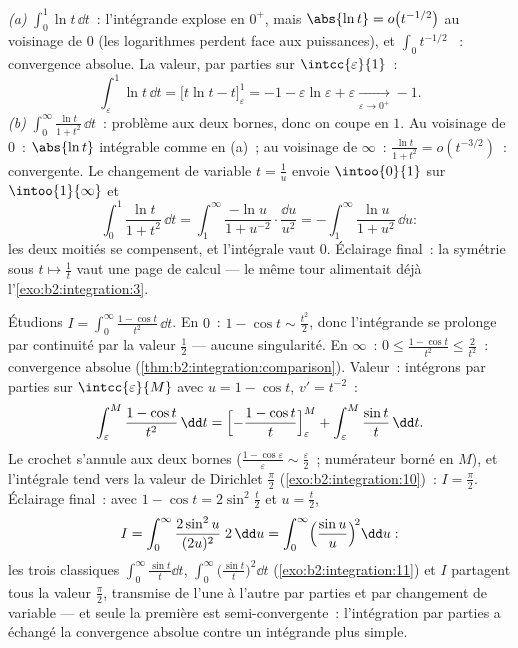 \begin{example}\label{ex:b2:integration:warmups}
\emph{(a)} $\displaystyle\int_0^1 \ln t\,\dd t$~: l'intégrande
explose en $0^+$, mais $\abs{\ln t} = o\bigl(t^{-1/2}\bigr)$
au voisinage de $0$ (les logarithmes perdent face aux puissances), et $\int_0 t^{-1/2}$
~: convergence absolue. La valeur, par parties sur
$\intcc{\varepsilon}{1}$~:
\[
\int_\varepsilon^1 \ln t\,\dd t
= \bigl[t\ln t - t\bigr]_\varepsilon^1
= -1 - \varepsilon\ln\varepsilon + \varepsilon
\xrightarrow[\varepsilon\to0^+]{} -1 .
\]
\emph{(b)} $\displaystyle\int_0^\infty \frac{\ln t}{1 +
t^2}\,\dd t$~: problème aux deux bornes, donc on coupe en $1$. Au voisinage de $0$~:
$\abs{\ln t}$ intégrable comme en (a)~; au voisinage de $\infty$~: $\frac{\ln
t}{1+t^2} = o(t^{-3/2})$~:  convergente. Le
changement de variable $t = \frac1u$ envoie $\intoo{0}{1}$ sur
$\intoo{1}{\infty}$ et
\[
\int_0^1 \frac{\ln t}{1+t^2}\,\dd t
= \int_1^{\infty} \frac{-\ln u}{1 + u^{-2}}\cdot
\frac{\dd u}{u^2}
= -\int_1^\infty \frac{\ln u}{1+u^2}\,\dd u :
\]
les deux moitiés se compensent, et l'intégrale vaut $0$. Éclairage
final~: la symétrie sous $t \mapsto \frac1t$ vaut une page de
calcul --- le même tour alimentait déjà
l'\cref{exo:b2:integration:3}.
\end{example}

\begin{example}\label{ex:b2:integration:onecos}
Étudions $I = \displaystyle\int_0^{\infty} \frac{1 - \cos
t}{t^2}\,\dd t$. En $0$~: $1 - \cos t \sim \frac{t^2}2$, donc
l'intégrande se prolonge par continuité par la valeur $\frac12$ --- aucune
singularité. En $\infty$~: $0 \leq \frac{1 - \cos t}{t^2}
\leq \frac{2}{t^2}$~: convergence absolue
(\cref{thm:b2:integration:comparison}). Valeur~: intégrons par
parties sur $\intcc{\varepsilon}{M}$ avec $u = 1 - \cos t$, $v' =
t^{-2}$~:
\[
\int_\varepsilon^M \frac{1 - \cos t}{t^2}\,\dd t
= \Bigl[-\frac{1 - \cos t}{t}\Bigr]_\varepsilon^M
+ \int_\varepsilon^M \frac{\sin t}{t}\,\dd t .
\]
Le crochet s'annule aux deux bornes ($\frac{1 -
\cos\varepsilon}{\varepsilon} \sim \frac\varepsilon2$~; numérateur
borné en $M$), et l'intégrale tend vers la valeur de Dirichlet
$\frac\pi2$ (\cref{exo:b2:integration:10})~: $I = \frac\pi2$.
Éclairage final~: avec $1 - \cos t = 2\sin^2\frac t2$ et $u =
\frac t2$,
\[
I = \int_0^\infty \frac{2\sin^2 u}{(2u)^2}\;2\,\dd u
= \int_0^\infty \Bigl(\frac{\sin u}{u}\Bigr)^{\!2}\dd u :
\]
les trois classiques $\int_0^\infty\frac{\sin t}{t}\dd t$,
$\int_0^\infty\bigl(\frac{\sin t}{t}\bigr)^2\dd t$
(\cref{exo:b2:integration:11}) et $I$ partagent tous la valeur
$\frac\pi2$, transmise de l'une à l'autre par parties et par
changement de variable --- et seule la première est
semi-convergente~: l'intégration par parties a échangé la
convergence absolue contre un intégrande plus simple.
\end{example}

